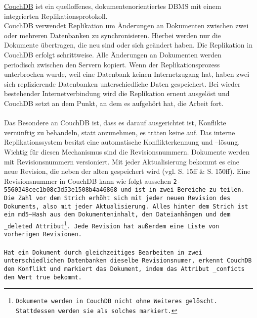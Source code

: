 \hyperref[chap:couch]{CouchDB} ist ein quelloffenes, dokumentenorientiertes \gls{DBMS} mit einem integrierten Replikationsprotokoll.\\
CouchDB verwendet Replikation um Änderungen an Dokumenten zwischen zwei oder mehreren Datenbanken zu synchronisieren.
Hierbei werden nur die Dokumente übertragen, die neu sind oder sich geändert haben.
Die Replikation in CouchDB erfolgt schrittweise. Alle Änderungen an Dokumenten werden periodisch zwischen den Servern kopiert.
Wenn der Replikationsprozess unterbrochen wurde, weil eine Datenbank keinen Internetzugang hat, haben zwei sich replizierende Datenbanken unterschiedliche Daten gespeichert.
Bei wieder bestehender Internetverbindung wird die Replikation erneut ausgelöst und CouchDB setzt an dem Punkt, an dem es aufgehört hat, die Arbeit fort.\\\\
%
%
Das Besondere an CouchDB ist, dass es darauf ausgerichtet ist, Konflikte vernünftig zu behandeln, statt anzunehmen, es träten keine auf.
Das interne Replikationssystem besitzt eine automatische Konflikterkennung und --lösung.\\
Wichtig für diesen Mechanismus sind die Revisionsnummern.
Dokumente werden mit Revisionsnummern versioniert. Mit jeder Aktualisierung bekommt es eine neue Revision, die neben der alten gespeichert wird (vgl. \cite{couchDB} S. 15ff \& S. 150ff). 
Eine Revisionsnummer in CouchDB kann wie folgt aussehen \tt{2-5560348cec1b08c3d53e1508b4a46868} und ist in zwei Bereiche zu teilen. Die Zahl vor dem Strich erhöht sich mit jeder neuen Revision des Dokuments, also mit jeder Aktualisierung. Alles hinter dem Strich ist ein md5--\gls{Hash} aus dem Dokumenteninhalt, den Dateianhängen und dem \tt{\_deleted} Attribut\footnote{ Dokumente werden in CouchDB nicht ohne Weiteres gelöscht. Stattdessen werden sie als solches markiert.}.
Jede Revision hat außerdem eine Liste von vorherigen Revisionen.\\\\
%
%
Hat ein Dokument durch gleichzeitiges Bearbeiten in zwei unterschiedlichen Datenbanken dieselbe Revisionsnumer, erkennt CouchDB den Konflikt und markiert das Dokument, indem das Attribut \tt{\_conficts} den Wert \tt{true} bekommt.
